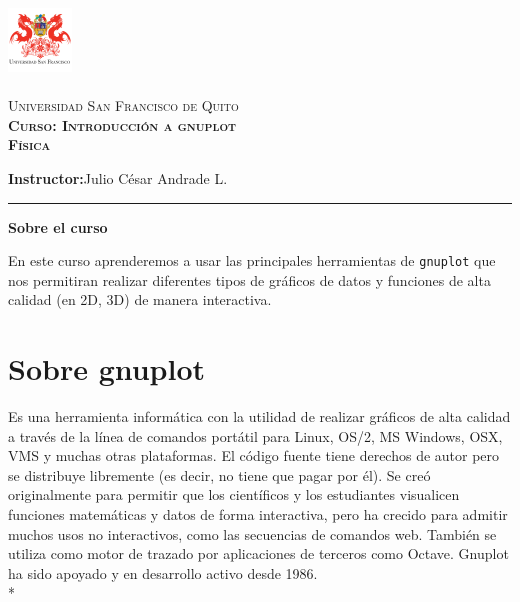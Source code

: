 \documentclass[11.5pt,a4paper]{article}
\begin{document}
\frenchspacing
\begin{center}
    \begin{minipage}{1.9cm}
		\begin{center}
			\includegraphics[width=1.7cm, height=2.0cm]{logo.png}
		\end{center}
	\end{minipage}
	\begin{minipage}{9.4cm}
		\begin{center}
				{\textsc{Universidad San Francisco de Quito}\\
						  \textsc{\textbf{Curso: Introducción a gnuplot}}\\
						  \textsc{\textbf{Física}} \\
                }
		\end{center}
	\end{minipage}
\end{center}

\thispagestyle{empty}\bigskip
\setlength{\marginparwidth}{5cm}
\small \noindent \textbf{Instructor:}\hspace{0.3cm}Julio César Andrade L.\\

\thispagestyle{empty}\bigskip

\par\noindent\rule{\textwidth}{0.4pt}
\vspace{0.5cm}
\begin{center}
\textbf{\large Sobre el curso} 
\end{center}
\vspace{0.5cm}

\small
En este curso aprenderemos a usar las principales herramientas de \texttt{gnuplot} que nos permitiran realizar diferentes tipos de gráficos de datos y funciones de alta calidad (en 2D, 3D) de manera interactiva. 
\vspace{0.5cm}
\normalsize

\section{Sobre gnuplot}

Es una herramienta informática con la utilidad de realizar gráficos de alta calidad a través de la línea de comandos portátil para Linux, OS/2, MS Windows, OSX, VMS y muchas otras plataformas. El código fuente tiene derechos de autor pero se distribuye libremente (es decir, no tiene que pagar por él). Se creó originalmente para permitir que los científicos y los estudiantes visualicen funciones matemáticas y datos de forma interactiva, pero ha crecido para admitir muchos usos no interactivos, como las secuencias de comandos web. También se utiliza como motor de trazado por aplicaciones de terceros como Octave. Gnuplot ha sido apoyado y en desarrollo activo desde 1986.\\* 
\end{document}
